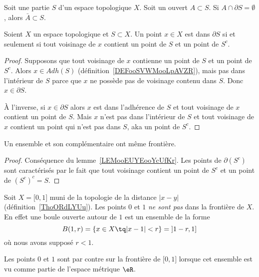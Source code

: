 \begin{proposition}	\label{PROPooYHIGooMDVKNy}
	Soit une partie \( S\) d'un espace topologique \( X\). Soit un ouvert \( A\subset S\). Si \( A\cap\partial S=\emptyset\), alors \( \bar A\subset S\).
\end{proposition}



\begin{lemma}      \label{LEMooEUYEooYcUfKr}
	Soient \( X\) un espace topologique et \( S\subset X\). Un point \( x\in X\) est dans \( \partial S\) si et seulement si tout voisinage de \( x\) contient un point de \( S\) et un point de \( S^c\).
\end{lemma}

\begin{proof}
	Supposons que tout voisinage de \( x\) contienne un point de \( S\) et un point de \( S^c\). Alors \( x\in Adh(S)\) (définition~\ref{DEFooSVWMooLpAVZR}), mais pas dans l'intérieur de \( S\) parce que \( x\) ne possède pas de voisinage contenu dans \( S\). Donc \( x\in \partial S\).

	À l'inverse, si \( x\in\partial S\) alors \( x\) est dans l'adhérence de \( S\) et tout voisinage de \( x\) contient un point de \( S\). Mais \( x\) n'est pas dans l'intérieur de \( S\) et tout voisinage de \( x\) contient un point qui n'est pas dans \( S\), aka un point de \( S^c\).
\end{proof}

\begin{corollary}
	Un ensemble et son complémentaire ont même frontière.
\end{corollary}

\begin{proof}
	Conséquence du lemme~\ref{LEMooEUYEooYcUfKr}. Les points de \( \partial(S^c)\) sont caractérisés par le fait que tout voisinage contient un point de \( S^c\) et un point de \( (S^c)^c=S\).
\end{proof}

\begin{example}
	Soit \( X=\mathopen[ 0 , 1 \mathclose]\) muni de la topologie de la distance \( | x-y |\) (définition~\ref{ThoORdLYUu}). Les points \( 0\) et \( 1\) \emph{ne sont pas} dans la frontière de \( X\). En effet une boule ouverte autour de \( 1\) est un ensemble de la forme
	\begin{equation}
		B(1,r)=\{ x\in X\tq | x-1 |<r \}=\mathopen] 1-r , 1 \mathclose]
	\end{equation}
	où nous avons supposé \( r<1\).

	Les points \( 0\) et \( 1\) sont par contre sur la frontière de \( \mathopen[ 0 , 1 \mathclose]\) lorsque cet ensemble est vu comme partie de l'espace métrique \( \eR\).
\end{example}

